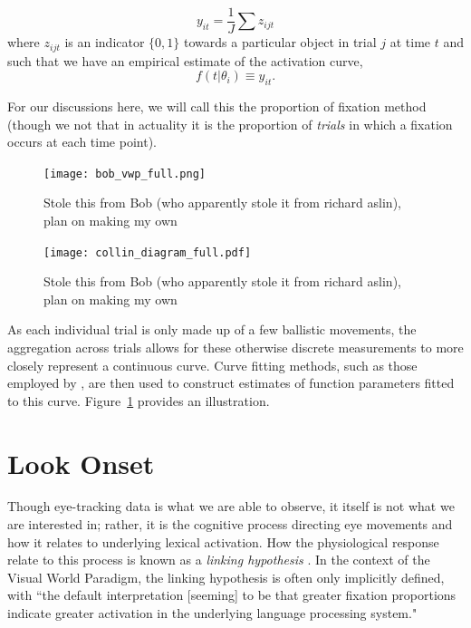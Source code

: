 \begin{equation}\label{eq:sum_proportions}
y_{it} = \frac1J \sum z_{ijt}
\end{equation}
where $z_{ijt}$ is an indicator $\{0, 1\}$  towards a particular object in trial $j$ at time $t$ and such that we have an empirical estimate of the activation curve,
\begin{equation}\label{eq:empir_to_activation}
f(t | \theta_i) \equiv y_{it}.
\end{equation}



For our discussions here, we will call this the proportion of fixation method (though we not that in actuality it is the proportion of \textit{trials} in which a fixation occurs at each time point).


\begin{figure}[H]
\centering
\texttt{[image: bob\_vwp\_full.png]}
\caption{Stole this from Bob (who apparently stole it from richard aslin), plan on making my own}
\label{fig:bob_diagram_full}
\end{figure}

\begin{figure}[H]
\centering
\texttt{[image: collin\_diagram\_full.pdf]}
\caption{Stole this from Bob (who apparently stole it from richard aslin), plan on making my own}
\label{fig:collin_diagram_full}
\end{figure}



As each individual trial is only made up of a few ballistic movements, the aggregation across trials allows for these otherwise discrete measurements to more closely represent a continuous curve. Curve fitting methods, such as those employed by , are then used to construct estimates of function parameters fitted to this curve. Figure~\ref{fig:bob_diagram_full} provides an illustration.


\section{Look Onset}

Though eye-tracking data is what we are able to observe, it itself is not what we are interested in; rather, it is the cognitive process directing eye movements and how it relates to underlying lexical activation. How the physiological response relate to this process is known as a \textit{linking hypothesis} \cite{Magnuson2019}. In the context of the Visual World Paradigm, the linking hypothesis is often only implicitly defined, with ``the default interpretation [seeming] to be that greater fixation proportions indicate greater activation in the underlying language processing system." 

